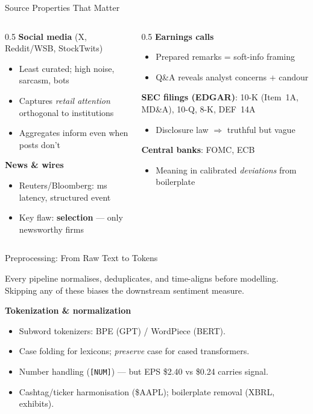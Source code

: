 \documentclass[9pt,t]{beamer}
\begin{document}
\begin{frame}{Source Properties That Matter}
\begin{columns}[T]
\begin{column}{0.5\textwidth}
\textbf{Social media} (X, Reddit/WSB, StockTwits)
\begin{itemize}\footnotesize
  \item Least curated; high noise, sarcasm, bots
  \item Captures \emph{retail attention} orthogonal to institutions
  \item Aggregates inform even when posts don't
\end{itemize}
\medskip
\textbf{News \& wires}
\begin{itemize}\footnotesize
  \item Reuters/Bloomberg: ms latency, structured event
  \item Key flaw: \textbf{selection} --- only newsworthy firms
\end{itemize}
\end{column}
\begin{column}{0.5\textwidth}
\textbf{Earnings calls}
\begin{itemize}\footnotesize
  \item Prepared remarks = soft-info framing
  \item Q\&A reveals analyst concerns + candour
\end{itemize}
\medskip
\textbf{SEC filings (EDGAR)}: 10-K (Item~1A, MD\&A), 10-Q, 8-K, DEF~14A
\begin{itemize}\footnotesize
  \item Disclosure law $\Rightarrow$ truthful but vague
\end{itemize}
\medskip
\textbf{Central banks}: FOMC, ECB
\begin{itemize}\footnotesize
  \item Meaning in calibrated \emph{deviations} from boilerplate
\end{itemize}
\end{column}
\end{columns}
\end{frame}

\begin{frame}{Preprocessing: From Raw Text to Tokens}
\begin{underhood}
Every pipeline normalises, deduplicates, and time-aligns before modelling.
Skipping any of these biases the downstream sentiment measure.
\end{underhood}

\medskip
\textbf{Tokenization \& normalization}
\begin{itemize}\small
  \item Subword tokenizers: BPE (GPT) / WordPiece (BERT).
  \item Case folding for lexicons; \emph{preserve} case for cased transformers.
  \item Number handling (\texttt{[NUM]}) --- but EPS \$2.40 vs \$0.24 carries signal.
  \item Cashtag/ticker harmonisation (\$AAPL); boilerplate removal (XBRL, exhibits).
\end{itemize}
\end{frame}
\end{document}
